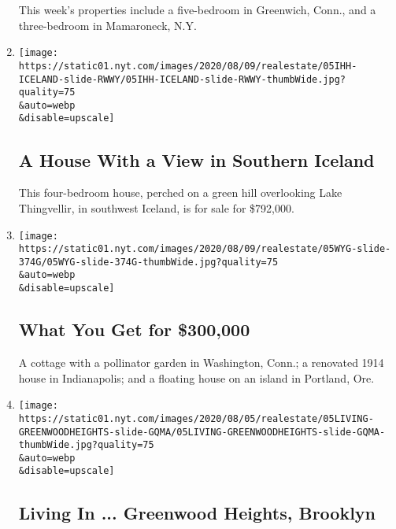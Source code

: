 \begin{enumerate}
  This week's properties include a five-bedroom in Greenwich, Conn., and
  a three-bedroom in Mamaroneck, N.Y.
\item
  \href{/slideshow/2020/08/05/realestate/a-house-with-a-view-in-southern-iceland.html}{}

  \texttt{[image: https://static01.nyt.com/images/2020/08/09/realestate/05IHH-ICELAND-slide-RWWY/05IHH-ICELAND-slide-RWWY-thumbWide.jpg?quality=75\\\&auto=webp\\\&disable=upscale]}

  \hypertarget{a-house-with-a-view-in-southern-iceland}{%
  \subsection{A House With a View in Southern
  Iceland}\label{a-house-with-a-view-in-southern-iceland}}

  This four-bedroom house, perched on a green hill overlooking Lake
  Thingvellir, in southwest Iceland, is for sale for \$792,000.
\item
  \href{/slideshow/2020/08/05/realestate/what-you-get-for-300000.html}{}

  \texttt{[image: https://static01.nyt.com/images/2020/08/09/realestate/05WYG-slide-374G/05WYG-slide-374G-thumbWide.jpg?quality=75\\\&auto=webp\\\&disable=upscale]}

  \hypertarget{what-you-get-for-300000}{%
  \subsection{What You Get for
  \$300,000}\label{what-you-get-for-300000}}

  A cottage with a pollinator garden in Washington, Conn.; a renovated
  1914 house in Indianapolis; and a floating house on an island in
  Portland, Ore.
\item
  \href{/slideshow/2020/08/05/realestate/living-in-greenwood-heights-brooklyn.html}{}

  \texttt{[image: https://static01.nyt.com/images/2020/08/05/realestate/05LIVING-GREENWOODHEIGHTS-slide-GQMA/05LIVING-GREENWOODHEIGHTS-slide-GQMA-thumbWide.jpg?quality=75\\\&auto=webp\\\&disable=upscale]}

  \hypertarget{living-in--greenwood-heights-brooklyn}{%
  \subsection{Living In ... Greenwood Heights,
  Brooklyn}\label{living-in--greenwood-heights-brooklyn}}


\end{enumerate}
